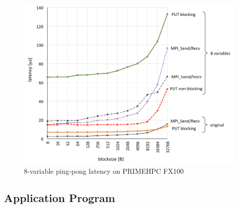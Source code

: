 \begin{figure}[bth]
  \begin{center}
    \mbox{\includegraphics[scale=0.45]{graphs/8var-latency-2.pdf}}
    \caption{8-variable ping-pong latency on PRIMEHPC FX100}\label{fig:8var-pingpong}
   \end{center}
\end{figure}
    



\subsection{Application Program}

